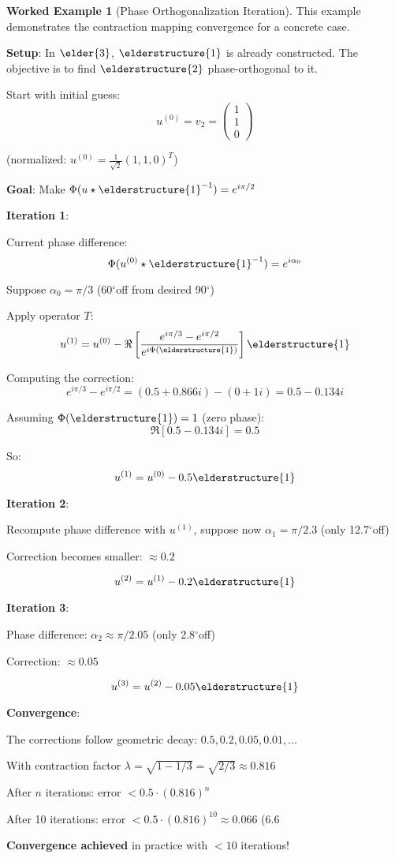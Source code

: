 \documentclass[12pt,a4paper]{article}
\newcommand{\degree}{$^\circ$}
\theoremstyle{definition}
\newtheorem{example}{Worked Example}[section]
\theoremstyle{remark}
\begin{document}
\begin{example}[Phase Orthogonalization Iteration]
This example demonstrates the contraction mapping convergence for a concrete case.

\textbf{Setup}: In $\elder{3}$, $\elderstructure{1}$ is already constructed. The objective is to find $\elderstructure{2}$ phase-orthogonal to it.

Start with initial guess:
$$u^{(0)} = v_2 = \begin{pmatrix} 1 \\ 1 \\ 0 \end{pmatrix}$$ 

(normalized: $u^{(0)} = \frac{1}{\sqrt{2}}(1, 1, 0)^T$)

\textbf{Goal}: Make $\Phi(u \star \elderstructure{1}^{-1}) = e^{i\pi/2}$

\textbf{Iteration 1}:

Current phase difference:
$$\Phi(u^{(0)} \star \elderstructure{1}^{-1}) = e^{i\alpha_0}$$

Suppose $\alpha_0 = \pi/3$ (60\degree off from desired 90\degree)

Apply operator $T$:
$$u^{(1)} = u^{(0)} - \Re\left[\frac{e^{i\pi/3} - e^{i\pi/2}}{e^{i\Phi(\elderstructure{1})}}\right] \elderstructure{1}$$

Computing the correction:
$$e^{i\pi/3} - e^{i\pi/2} = (0.5 + 0.866i) - (0 + 1i) = 0.5 - 0.134i$$

Assuming $\Phi(\elderstructure{1}) = 1$ (zero phase):
$$\Re[0.5 - 0.134i] = 0.5$$

So:
$$u^{(1)} = u^{(0)} - 0.5 \elderstructure{1}$$

\textbf{Iteration 2}:

Recompute phase difference with $u^{(1)}$, suppose now $\alpha_1 = \pi/2.3$ (only 12.7\degree off)

Correction becomes smaller: $\approx 0.2$

$$u^{(2)} = u^{(1)} - 0.2 \elderstructure{1}$$

\textbf{Iteration 3}:

Phase difference: $\alpha_2 \approx \pi/2.05$ (only 2.8\degree off)

Correction: $\approx 0.05$

$$u^{(3)} = u^{(2)} - 0.05 \elderstructure{1}$$

\textbf{Convergence}:

The corrections follow geometric decay: $0.5, 0.2, 0.05, 0.01, ...$

With contraction factor $\lambda = \sqrt{1 - 1/3} = \sqrt{2/3} \approx 0.816$

After $n$ iterations: error $< 0.5 \cdot (0.816)^n$

After 10 iterations: error $< 0.5 \cdot (0.816)^{10} \approx 0.066$ (6.6%

\textbf{Convergence achieved} in practice with $<10$ iterations!
\end{example}
\end{document}
